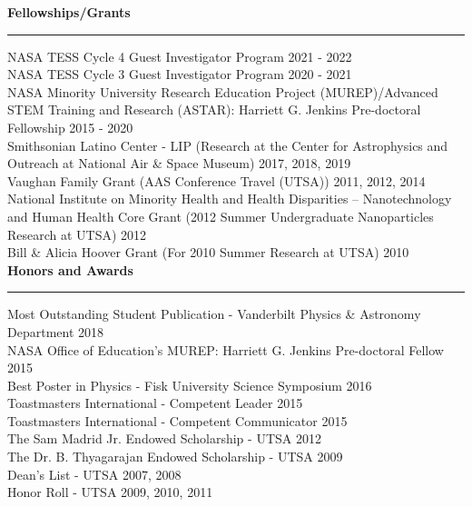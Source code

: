 \documentclass[letter,11pt]{article}
\begin{document}
\noindent
{\bf Fellowships/Grants} \\
\vspace{-10mm}
\begin{center}
\rule{\textwidth}{0.2mm}
\end{center}
\vspace{-3mm}
\noindent
NASA TESS Cycle 4 Guest Investigator Program \hfill 2021 - 2022 \\
NASA TESS Cycle 3 Guest Investigator Program \hfill 2020 - 2021 \\
NASA Minority University Research Education Project (MUREP)/Advanced STEM Training and Research (ASTAR): Harriett G. Jenkins Pre-doctoral Fellowship \hfill 2015 - 2020 \\
Smithsonian Latino Center - LIP (Research at the Center for Astrophysics and Outreach at National Air \& Space Museum) \hfill 2017, 2018, 2019 \\
Vaughan Family Grant (AAS Conference Travel (UTSA)) \hfill 2011, 2012, 2014 \\
National Institute on Minority Health and Health Disparities – Nanotechnology and Human Health Core Grant (2012 Summer Undergraduate Nanoparticles Research at UTSA) \hfill 2012 \\
Bill \& Alicia Hoover Grant (For 2010 Summer Research at UTSA) \hfill 2010 \\


\noindent
{\bf Honors and Awards} \\
\vspace{-10mm}
\begin{center}
\rule{\textwidth}{0.2mm}
\end{center}
\vspace{-3mm}
\noindent
Most Outstanding Student Publication - Vanderbilt Physics \& Astronomy Department \hfill 2018 \\
NASA Office of Education's MUREP: Harriett G. Jenkins Pre-doctoral Fellow \hfill 2015 \\
Best Poster in Physics - Fisk University Science Symposium \hfill 2016 \\
Toastmasters International - Competent Leader \hfill 2015 \\
Toastmasters International - Competent Communicator \hfill 2015 \\
The Sam Madrid Jr. Endowed Scholarship - UTSA \hfill 2012 \\
The Dr. B. Thyagarajan Endowed Scholarship - UTSA \hfill 2009 \\
Dean’s List - UTSA \hfill 2007, 2008 \\
Honor Roll - UTSA \hfill 2009, 2010, 2011 \\
\end{document}

